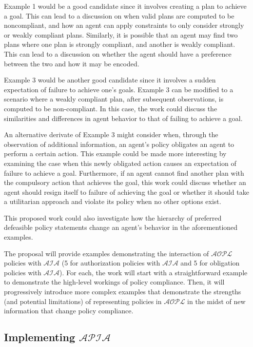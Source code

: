 Example 1 would be a good candidate since it involves creating a plan to achieve a goal.
This can lead to a discussion on when valid plans are computed to be noncompliant, and how an agent can apply constraints to only consider strongly or weakly compliant plans.
Similarly, it is possible that an agent may find two plans where one plan is strongly compliant, and another is weakly compliant.
This can lead to a discussion on whether the agent should have a preference between the two and how it may be encoded.

Example 3 would be another good candidate since it involves a sudden expectation of failure to achieve one's goals.
Example 3 can be modified to a scenario where a weakly compliant plan, after subsequent observations, is computed to be non-compliant.
In this case, the work could discuss the similarities and differences in agent behavior to that of failing to achieve a goal.

An alternative derivate of Example 3 might consider when, through the observation of additional information, an agent's policy obligates an agent to perform a certain action.
This example could be made more interesting by examining the case when this newly obligated action causes an expectation of failure to achieve a goal.
Furthermore, if an agent cannot find another plan with the compulsory action that achieves the goal, this work could discuss whether an agent should resign itself to failure of achieving the goal or whether it should take a utilitarian approach and violate its policy when no other options exist.

This proposed work could also investigate how the hierarchy of preferred defeasible policy statements change an agent's behavior in the aforementioned examples.

The proposal will provide examples demonstrating the interaction of $\mathcal{AOPL}$ policies with $\mathcal{AIA}$ (5 for authorization policies with $\mathcal{AIA}$ and 5 for obligation policies with $\mathcal{AIA}$).
For each, the work will start with a straightforward example to demonstrate the high-level workings of policy compliance.
Then, it will progressively introduce more complex examples that demonstrate the strengths (and potential limitations) of representing policies in $\mathcal{AOPL}$ in the midst of new information that change policy compliance.

\subsection{Implementing $\mathcal{APIA}$}

